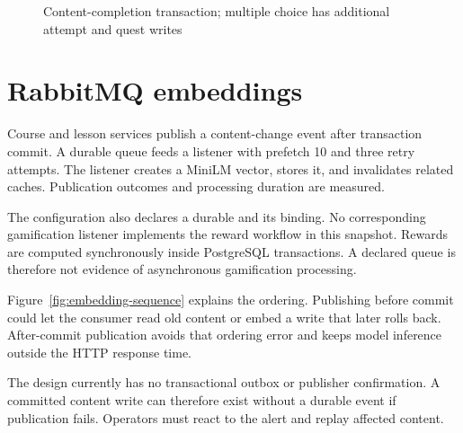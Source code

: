\documentclass[12pt,a4paper,oneside]{report}
\begin{document}
\progressstatediagram

\begin{figure}[H]\centering
{}
\caption{Content-completion transaction; multiple choice has additional attempt and quest writes}\label{fig:progress}
\end{figure}

\section{RabbitMQ embeddings}
Course and lesson services publish a content-change event after transaction commit.
A durable queue feeds a listener with prefetch 10 and three retry attempts. The
listener creates a MiniLM vector, stores it, and invalidates related caches.
Publication outcomes and processing duration are measured.

The configuration also declares a durable  and its binding.
No corresponding gamification listener implements the reward workflow in this
snapshot. Rewards are computed synchronously inside PostgreSQL transactions. A
declared queue is therefore not evidence of asynchronous gamification processing.

Figure~\ref{fig:embedding-sequence} explains the ordering. Publishing before commit
could let the consumer read old content or embed a write that later rolls back.
After-commit publication avoids that ordering error and keeps model inference outside
the HTTP response time.

\embeddingsequencediagram

The design currently has no transactional outbox or publisher confirmation. A
committed content write can therefore exist without a durable event if publication
fails. Operators must react to the alert and replay affected content.
\end{document}
